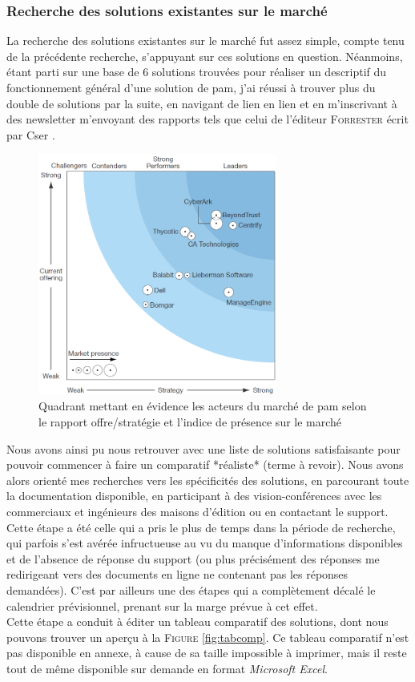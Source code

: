 \subsubsection{Recherche des solutions existantes sur le marché}
\label{par:sol_market}
La recherche des solutions existantes sur le marché fut assez simple, compte tenu de la précédente recherche, s'appuyant sur ces solutions en question. Néanmoins, étant parti sur une base de 6 solutions trouvées pour réaliser un descriptif du fonctionnement général d'une solution de \gls{pam}, j'ai réussi à trouver plus du double de solutions par la suite, en navigant de lien en lien et en m'inscrivant à des newsletter m'envoyant des rapports tels que celui de l'éditeur \textsc{Forrester} écrit par Cser \cite{acs}.

\begin{figure}[!ht]
    \center
    \includegraphics[width=0.7\textwidth]{./images/forrester_quadrant.png}
    \caption{Quadrant mettant en évidence les acteurs du marché de \gls{pam} selon le rapport offre/stratégie et l'indice de présence sur le marché}
\end{figure}

Nous avons ainsi pu nous retrouver avec une liste de solutions satisfaisante pour pouvoir commencer à faire un comparatif *réaliste* (terme à revoir). Nous avons alors orienté mes recherches vers les spécificités des solutions, en parcourant toute la documentation disponible, en participant à des vision-conférences avec les commerciaux et ingénieurs des maisons d'édition ou en contactant le support. Cette étape a été celle qui a pris le plus de temps dans la période de recherche, qui parfois s'est avérée infructueuse au vu du manque d'informations disponibles et de l'absence de réponse du support (ou plus précisément des réponses me redirigeant vers des documents en ligne ne contenant pas les réponses demandées). C'est par ailleurs une des étapes qui a complètement décalé le calendrier prévisionnel, prenant sur la marge prévue à cet effet.\\
Cette étape a conduit à éditer un tableau comparatif des solutions, dont nous pouvons trouver un aperçu à la \textsc{Figure }\ref{fig:tabcomp}. Ce tableau comparatif n'est pas disponible en annexe, à cause de sa taille impossible à imprimer, mais il reste tout de même disponible sur demande en format \emph{Microsoft Excel}.

